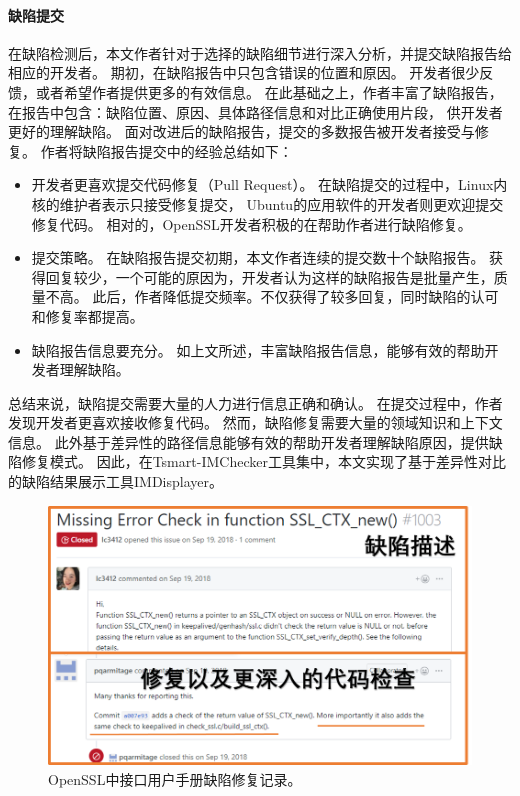 \paragraph{缺陷提交}
在缺陷检测后，本文作者针对于选择的缺陷细节进行深入分析，并提交缺陷报告给相应的开发者。
期初，在缺陷报告中只包含错误的位置和原因。
开发者很少反馈，或者希望作者提供更多的有效信息。
在此基础之上，作者丰富了缺陷报告，在报告中包含：缺陷位置、原因、具体路径信息和对比正确使用片段，
供开发者更好的理解缺陷。
面对改进后的缺陷报告，提交的多数报告被开发者接受与修复。
作者将缺陷报告提交中的经验总结如下：
\begin{itemize}
	\item 开发者更喜欢提交代码修复（Pull Request）。
	在缺陷提交的过程中，Linux内核的维护者表示只接受修复提交，
	Ubuntu的应用软件的开发者则更欢迎提交修复代码。
	相对的，OpenSSL开发者积极的在帮助作者进行缺陷修复。
	\item 提交策略。
	在缺陷报告提交初期，本文作者连续的提交数十个缺陷报告。
	获得回复较少，一个可能的原因为，开发者认为这样的缺陷报告是批量产生，质量不高。
	此后，作者降低提交频率。不仅获得了较多回复，同时缺陷的认可和修复率都提高。
	\item 缺陷报告信息要充分。
	如上文所述，丰富缺陷报告信息，能够有效的帮助开发者理解缺陷。
\end{itemize}

总结来说，缺陷提交需要大量的人力进行信息正确和确认。
在提交过程中，作者发现开发者更喜欢接收修复代码。
然而，缺陷修复需要大量的领域知识和上下文信息。
此外基于差异性的路径信息能够有效的帮助开发者理解缺陷原因，提供缺陷修复模式。
因此，在Tsmart-IMChecker工具集中，本文实现了基于差异性对比的缺陷结果展示工具IMDisplayer。

\begin{figure}[b]
	\centering
	\includegraphics[width=0.8\linewidth]{figures/cp4-keepalived-fix.png}
	\caption{
		OpenSSL中接口用户手册缺陷修复记录。
	}
	\label{fig:4-4-keepalived-fix}
\end{figure}

